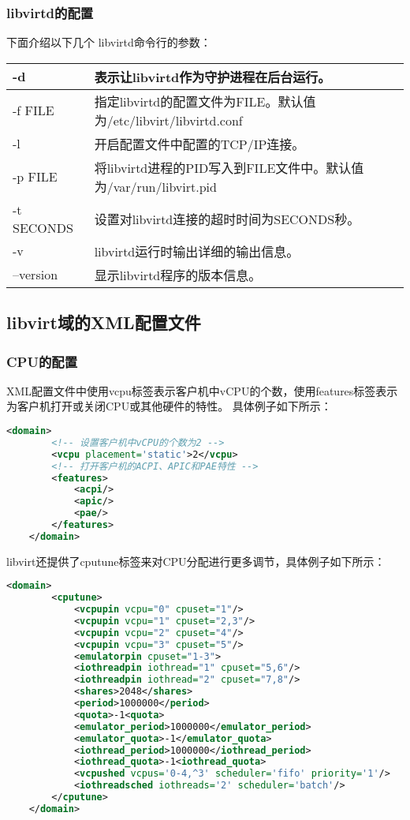 \documentclass[a4paper,left=2.5cm,right=2.5cm,11pt]{article}
\newcommand{\interval}{\vspace{0.5em}}
\begin{document}
\subsubsection{libvirtd的配置}
	下面介绍以下几个 libvirtd命令行的参数：
	\interval
	\begin{longtable}{p{2.5cm}p{10cm}}
	\hline
	-d & 表示让libvirtd作为守护进程在后台运行。 \\
	\hline
	-f FILE & 指定libvirtd的配置文件为FILE。默认值为/etc/libvirt/libvirtd.conf\\
	\hline
	-l & 开启配置文件中配置的TCP/IP连接。 \\
	\hline
	-p FILE & 将libvirtd进程的PID写入到FILE文件中。默认值为/var/run/libvirt.pid \\ 
	\hline
	-t SECONDS & 设置对libvirtd连接的超时时间为SECONDS秒。 \\
	\hline
	-v & libvirtd运行时输出详细的输出信息。 \\
	\hline
	--version & 显示libvirtd程序的版本信息。 \\
	\hline
	\end{longtable}

\subsection{libvirt域的XML配置文件}
\subsubsection{CPU的配置}
	XML配置文件中使用vcpu标签表示客户机中vCPU的个数，使用features标签表示为客户机打开或关闭CPU或其他硬件的特性。
	具体例子如下所示：
	\begin{lstlisting}[language = XML]
	<domain>
		<!-- 设置客户机中vCPU的个数为2 -->
		<vcpu placement='static'>2</vcpu>
		<!-- 打开客户机的ACPI、APIC和PAE特性 -->
		<features>
			<acpi/>
			<apic/>
			<pae/>
		</features>
	</domain>
	\end{lstlisting}

	libvirt还提供了cputune标签来对CPU分配进行更多调节，具体例子如下所示：
	\begin{lstlisting}[language = XML]
	<domain>
		<cputune>
			<vcpupin vcpu="0" cpuset="1"/>
			<vcpupin vcpu="1" cpuset="2,3"/>
			<vcpupin vcpu="2" cpuset="4"/>
			<vcpupin vcpu="3" cpuset="5"/>
			<emulatorpin cpuset="1-3">
			<iothreadpin iothread="1" cpuset="5,6"/>
			<iothreadpin iothread="2" cpuset="7,8"/>
			<shares>2048</shares>
			<period>1000000</period>
			<quota>-1<quota>
			<emulator_period>1000000</emulator_period>
			<emulator_quota>-1</emulator_quota>
			<iothread_period>1000000</iothread_period>
			<iothread_quota>-1<iothread_quota>
			<vcpushed vcpus='0-4,^3' scheduler='fifo' priority='1'/>
			<iothreadsched iothreads='2' scheduler='batch'/>
		</cputune>
	</domain>
	\end{lstlisting}
\end{document}
